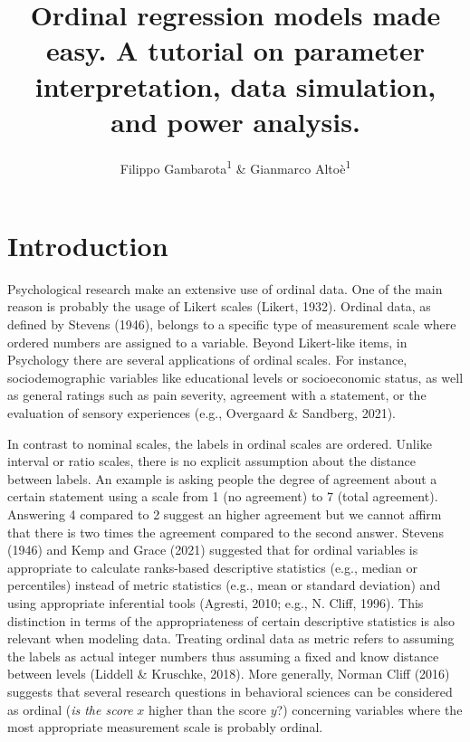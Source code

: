 \documentclass[
  man,floatsintext]{apa6}
\title{Ordinal regression models made easy. A tutorial on parameter interpretation, data simulation, and power analysis.}
\author{Filippo Gambarota\textsuperscript{1} \& Gianmarco Altoè\textsuperscript{1}}
\date{}
\affiliation{\vspace{0.5cm}\textsuperscript{1} Department of Developmental Psychology and Socialization, University of Padova, Italy}
\begin{document}
\maketitle

\scriptsize

\normalsize

\scriptsize

\normalsize

\section{Introduction}\label{introduction}

Psychological research make an extensive use of ordinal data. One of the main reason is probably the usage of Likert scales (Likert, 1932). Ordinal data, as defined by Stevens (1946), belongs to a specific type of measurement scale where ordered numbers are assigned to a variable. Beyond Likert-like items, in Psychology there are several applications of ordinal scales. For instance, sociodemographic variables like educational levels or socioeconomic status, as well as general ratings such as pain severity, agreement with a statement, or the evaluation of sensory experiences (e.g., Overgaard \& Sandberg, 2021).

In contrast to nominal scales, the labels in ordinal scales are ordered. Unlike interval or ratio scales, there is no explicit assumption about the distance between labels. An example is asking people the degree of agreement about a certain statement using a scale from 1 (no agreement) to 7 (total agreement). Answering 4 compared to 2 suggest an higher agreement but we cannot affirm that there is two times the agreement compared to the second answer. Stevens (1946) and Kemp and Grace (2021) suggested that for ordinal variables is appropriate to calculate ranks-based descriptive statistics (e.g., median or percentiles) instead of metric statistics (e.g., mean or standard deviation) and using appropriate inferential tools (Agresti, 2010; e.g., N. Cliff, 1996). This distinction in terms of the appropriateness of certain descriptive statistics is also relevant when modeling data. Treating ordinal data as metric refers to assuming the labels as actual integer numbers thus assuming a fixed and know distance between levels (Liddell \& Kruschke, 2018). More generally, Norman Cliff (2016) suggests that several research questions in behavioral sciences can be considered as ordinal (\emph{is the score} \(x\) higher than the score \(y\)?) concerning variables where the most appropriate measurement scale is probably ordinal.
\end{document}
